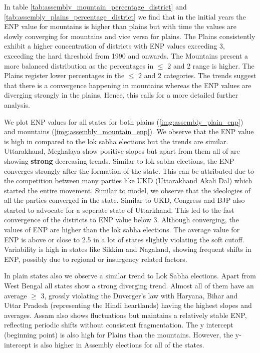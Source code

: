 In table \ref{tab:assembly_mountain_percentage_district} and \ref{tab:assembly_plains_percentage_district} we find that in the initial years the ENP value for mountains is higher than plains but with time the values are slowly converging for mountains and vice versa for plains. The Plains consistently exhibit a higher concentration of districts with ENP values exceeding $3$, exceeding the hard threshold from 1990 and onwards.  The Mountains present a more balanced distribution as the percentages in $\leq$ $2$ and 2  range is higher.  The Plains  register lower percentages in the $\leq$ $2$ and 2  categories. The trends suggest that there is a convergence happening in mountains whereas the ENP values are diverging strongly in the plains. Hence, this calls for a more detailed further analysis.

 We plot ENP values for all states for both plains (\ref{img:assembly_plain_enp}) and mountains (\ref{img:assembly_mountain_enp}). We observe that the ENP value is high in compared to the lok sabha elections but the trends are similar. Uttarakhand, Meghalaya show positive slopes but apart from them all of are showing \textbf{strong} decreasing trends. Similar to lok sabha elections, the ENP converges strongly after the formation of the state. This can be attributed due to the competition between many parties like UKD (Uttarakhand Akali Dal) which started the entire movement. Similar to \cite{fey2007duverger} model, we observe that the ideologies of all the parties converged in the state. Similar to UKD, Congress and BJP also started to advocate for a seperate state of Uttarkhand. This led to the fast convergence of the districts to ENP value below 3. Although converging, the values of ENP are higher than the lok sabha elections. The average value for ENP is above or close to 2.5 in a lot of states slightly violating the soft cutoff. Variability is high in states like Sikkim and Nagaland, showing frequent shifts in ENP, possibly due to regional or insurgency related factors. 
 
 In plain states also we observe a similar trend to Lok Sabha elections. Apart from West Bengal all states show a strong diverging trend. Almost all of them have an average $\geq$ 3, grossly violating the Duverger's law with Haryana, Bihar and Uttar Pradesh (representing the Hindi heartlands) having the highest slopes and averages.  Assam also shows fluctuations but maintains a relatively stable ENP, reflecting periodic shifts without consistent fragmentation. The y intercept (beginning point) is also high for Plains than the mountains. However, the y-intercept is also higher in Assembly elections for all of the states. 


